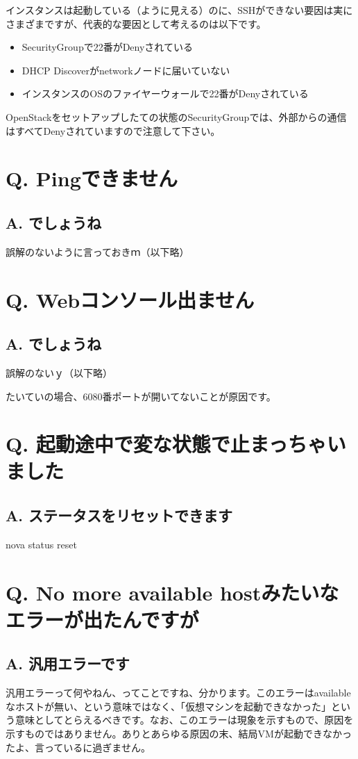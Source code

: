 \documentclass[9pt,b5paper,tombo,openany]{jsbook}
\begin{document}
インスタンスは起動している（ように見える）のに、SSHができない要因は実にさまざまですが、代表的な要因として考えるのは以下です。
\begin{itemize}
	\item SecurityGroupで22番がDenyされている
	\item DHCP Discoverがnetworkノードに届いていない
	\item インスタンスのOSのファイヤーウォールで22番がDenyされている
\end{itemize}
OpenStackをセットアップしたての状態のSecurityGroupでは、外部からの通信はすべてDenyされていますので注意して下さい。

\section*{Q. Pingできません}
\subsection*{A. でしょうね}
誤解のないように言っておきｍ（以下略）

\section*{Q. Webコンソール出ません}
\subsection*{A. でしょうね}
誤解のないｙ（以下略）

たいていの場合、6080番ポートが開いてないことが原因です。

\section*{Q. 起動途中で変な状態で止まっちゃいました}
\subsection*{A. ステータスをリセットできます}
nova status reset

\section*{Q. No more available hostみたいなエラーが出たんですが}
\subsection*{A. 汎用エラーです}
汎用エラーって何やねん、ってことですね、分かります。このエラーはavailableなホストが無い、という意味ではなく、「仮想マシンを起動できなかった」という意味としてとらえるべきです。なお、このエラーは現象を示すもので、原因を示すものではありません。ありとあらゆる原因の末、結局VMが起動できなかったよ、言っているに過ぎません。
\end{document}

